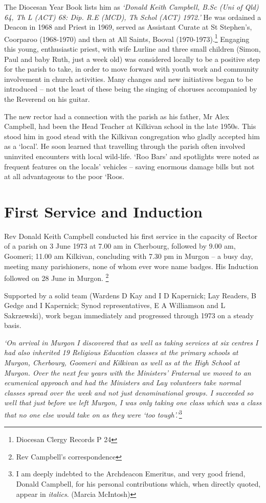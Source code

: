 The Diocesan Year Book lists him as \emph{`Donald Keith Campbell, B.Sc (Uni of Qld) 64, Th L (ACT) 68: Dip. R.E (MCD), Th Schol (ACT) 1972.'} He was ordained a Deacon in 1968 and Priest in 1969, served as Assistant Curate at St Stephen's, Coorparoo (1968-1970) and then at All Saints, Booval (1970-1973).\footnote{Diocesan Clergy Records P 24} Engaging this young, enthusiastic priest, with wife Lurline and three small children (Simon, Paul and baby Ruth, just a week old) was considered locally to be a positive step for the parish to take, in order to move forward with youth work and community involvement in church activities. Many changes and new initiatives began to be introduced -- not the least of these being the singing of choruses accompanied by the Reverend on his guitar.


The new rector had a connection with the parish as his father, Mr Alex Campbell, had been the Head Teacher at Kilkivan school in the late 1950s. This stood him in good stead with the Kilkivan congregation who gladly accepted him as a `local'. He soon learned that travelling through the parish often involved uninvited encounters with local wild-life. `Roo Bars' and spotlights were noted as frequent features on the locals' vehicles -- saving enormous damage bills but not at all advantageous to the poor `Roos.



\section{First Service and Induction}



Rev Donald Keith Campbell conducted his first service in the capacity of Rector of a parish on 3 June 1973 at 7.00 am in Cherbourg, followed by 9.00 am, Goomeri; 11.00 am Kilkivan, concluding with 7.30 pm in Murgon -- a busy day, meeting many parishioners, none of whom ever wore name badges. His Induction followed on 28 June in Murgon. \footnote{Rev Campbell's correspondence}


Supported by a solid team (Wardens D Kay and I D Kapernick; Lay Readers, B Gedge and I Kapernick; Synod representatives, E A Williamson and L Sakrzewski), work began immediately and progressed through 1973 on a steady basis.



\emph{`On arrival in Murgon I discovered that as well as taking services at six centres I had also inherited 19 Religious Education classes at the primary schools at Murgon, Cherbourg, Goomeri and Kilkivan as well as at the High School at Murgon. Over the next few years with the Ministers' Fraternal we moved to an ecumenical approach and had the Ministers and Lay volunteers take normal classes spread over the week and not just denominational groups. I succeeded so well that just before we left Murgon, I was only taking one class which was a class that no one else would take on as they were `too tough'.'}\footnote{I am deeply indebted to the Archdeacon Emeritus, and very good friend, Donald Campbell, for his personal contributions which, when directly quoted, appear in \emph{italics}. (Marcia McIntosh)}


